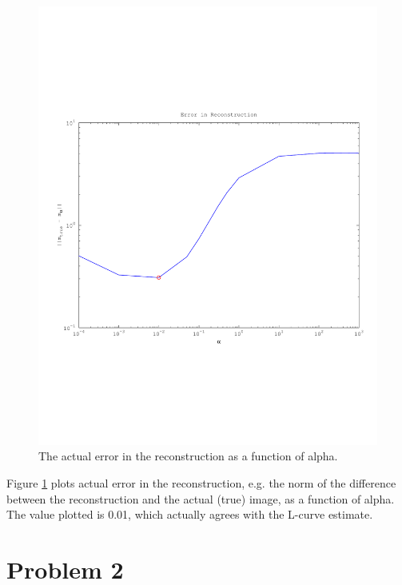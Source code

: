 \documentclass{article}
\begin{document}
\begin{figure}[!htb]
  \includegraphics[scale=.5]{plots/true1d.pdf}
  \caption{The actual error in the reconstruction as a function of
 alpha. } 
 \label{fig:actual}
\end{figure}

Figure \ref{fig:actual} plots actual error in the reconstruction,
e.g. the norm of the difference between the reconstruction and the
actual (true) image, as a function of alpha. The value plotted is 0.01,
which actually agrees with the L-curve estimate. 

\newpage
\section{Problem 2}

\end{document}
